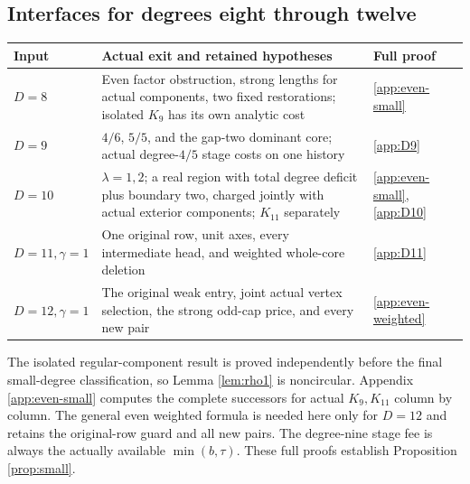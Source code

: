 \documentclass[11pt,a4paper]{article}
\theoremstyle{definition}
\begin{document}
\subsection{Interfaces for degrees eight through twelve}
\begin{center}\small
\begin{tabular}{P{.14\textwidth}P{.49\textwidth}P{.22\textwidth}}
\toprule
Input & Actual exit and retained hypotheses & Full proof\\
\midrule
$D=8$ & Even factor obstruction, strong lengths for actual components, two fixed restorations; isolated $K_9$ has its own analytic cost & \ref{app:even-small}\\
$D=9$ & $4/6$, $5/5$, and the gap-two dominant core; actual degree-$4/5$ stage costs on one history & \ref{app:D9}\\
$D=10$ & $\lambda=1,2$; a real region with total degree deficit plus boundary two, charged jointly with actual exterior components; $K_{11}$ separately & \ref{app:even-small}, \ref{app:D10}\\
$D=11,\gamma=1$ & One original row, unit axes, every intermediate head, and weighted whole-core deletion & \ref{app:D11}\\
$D=12,\gamma=1$ & The original weak entry, joint actual vertex selection, the strong odd-cap price, and every new pair & \ref{app:even-weighted}\\
\bottomrule
\end{tabular}
\end{center}
The isolated regular-component result is proved independently before the final small-degree classification, so Lemma \ref{lem:rho1} is noncircular. Appendix \ref{app:even-small} computes the complete successors for actual $K_9,K_{11}$ column by column. The general even weighted formula is needed here only for $D=12$ and retains the original-row guard and all new pairs. The degree-nine stage fee is always the actually available $\min(b,\tau)$. These full proofs establish Proposition \ref{prop:small}.
\end{document}
